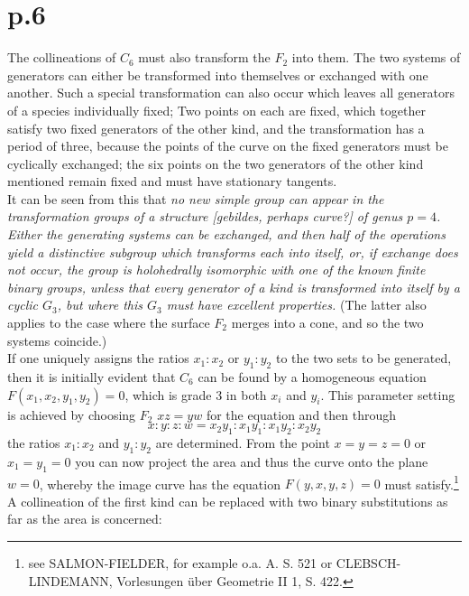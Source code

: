 \documentclass[leqno]{article}
\begin{document}
\section{p.6}
The collineations of $ C_6 $ must also transform the $ F_2 $ into them. The two systems of generators can either be transformed into themselves or exchanged with one another. Such a special transformation can also occur which leaves all generators of a species individually fixed; Two points on each are fixed, which together satisfy two fixed generators of the other kind, and the transformation has a period of three, because the points of the curve on the fixed generators must be cyclically exchanged; the six points on the two generators of the other kind mentioned remain fixed and must have stationary tangents. \\
It can be seen from this that \textit{no new simple group can appear in the transformation groups of a structure [gebildes, perhaps curve?] of genus $ p = 4 $. Either the generating systems can be exchanged, and then half of the operations yield a distinctive subgroup which transforms each into itself, or, if exchange does not occur, the group is holohedrally isomorphic with one of the known finite binary groups, unless that every generator of a kind is transformed into itself by a cyclic $ G_3 $, but where this $ G_3 $ must have excellent properties.} (The latter also applies to the case where the surface $ F_2 $ merges into a cone, and so the two systems coincide.) \\
If one uniquely assigns the ratios $ x_1: x_2 $ or $ y_1: y_2 $ to the two sets to be generated, then it is initially evident that $ C_6 $ can be found by a homogeneous equation $ F (x_1, x_2, y_1, y_2) = 0 $, which is grade 3 in both $ x_i $ and $ y_i $. This parameter setting is achieved by choosing $ F_2 $ $ xz = yw $ for the equation and then through
\begin{equation}\label{eq: 2.1}
x: y : z : w = x_2y_1 :x_1 y_1 : x_1 y_2: x_2 y_2 \tag{1}
\end{equation}
the ratios $ x_1: x_2 $ and $ y_1: y_2 $ are determined. From the point $ x = y = z = 0 $ or $ x_1 = y_1 = 0 $ you can now project the area and thus the curve onto the plane $ w = 0 $, whereby the image curve has the equation $ F (y, x, y, z) = 0 $ must satisfy.\footnote{see SALMON-FIELDER, for example o.a. A. S. 521 or CLEBSCH-LINDEMANN, Vorlesungen \"uber Geometrie II 1, S. 422.} \\
A collineation of the first kind can be replaced with two binary substitutions as far as the area is concerned:
\end{document}
